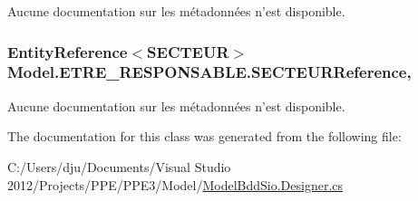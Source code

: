 Aucune documentation sur les métadonnées n'est disponible. 

\hypertarget{class_model_1_1_e_t_r_e___r_e_s_p_o_n_s_a_b_l_e_a87465cb676675c817cef32ad96f182e3}{
\subsubsection[{S\-E\-C\-T\-E\-U\-R\-Reference}]{\setlength{\rightskip}{0pt plus 5cm}Entity\-Reference$<${\bf S\-E\-C\-T\-E\-U\-R}$>$ Model.\-E\-T\-R\-E\-\_\-\-R\-E\-S\-P\-O\-N\-S\-A\-B\-L\-E.\-S\-E\-C\-T\-E\-U\-R\-Reference\hspace{0.3cm}{\ttfamily [get]}, {\ttfamily [set]}}}\label{class_model_1_1_e_t_r_e___r_e_s_p_o_n_s_a_b_l_e_a87465cb676675c817cef32ad96f182e3}


Aucune documentation sur les métadonnées n'est disponible. 



The documentation for this class was generated from the following file\-:\begin{DoxyCompactItemize}
\item 
C\-:/\-Users/dju/\-Documents/\-Visual Studio 2012/\-Projects/\-P\-P\-E/\-P\-P\-E3/\-Model/\hyperlink{_model_bdd_sio_8_designer_8cs}{Model\-Bdd\-Sio.\-Designer.\-cs}\end{DoxyCompactItemize}
